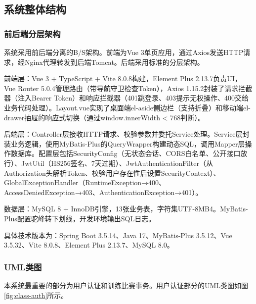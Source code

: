 \documentclass[12pt,a4paper]{ctexart}
\begin{document}
\subsection{系统整体结构}

\subsubsection{前后端分层架构}

系统采用前后端分离的B/S架构。前端为Vue 3单页应用，通过Axios发送HTTP请求，经Nginx代理转发到后端Tomcat。后端采用标准的分层架构。

前端层：Vue 3 + TypeScript + Vite 8.0.8构建，Element Plus 2.13.7负责UI，Vue Router 5.0.4管理路由（带导航守卫检查Token），Axios 1.15.2封装了请求拦截器（注入Bearer Token）和响应拦截器（401跳登录、403提示无权操作、400交给业务代码处理）。Layout.vue实现了桌面端el-aside侧边栏（支持折叠）和移动端el-drawer抽屉的响应式切换（通过window.innerWidth < 768判断）。

后端层：Controller层接收HTTP请求、校验参数并委托Service处理。Service层封装业务逻辑，使用MyBatis-Plus的QueryWrapper构建动态SQL，调用Mapper层操作数据库。配置层包括SecurityConfig（无状态会话、CORS白名单、公开接口放行）、JwtUtil（HS256签名、7天过期）、JwtAuthenticationFilter（从Authorization头解析Token、校验用户存在性后设置SecurityContext）、GlobalExceptionHandler（RuntimeException→400、AccessDeniedException→403、AuthenticationException→401）。

数据层：MySQL 8 + InnoDB引擎，13张业务表，字符集UTF-8MB4。MyBatis-Plus配置驼峰转下划线，开发环境输出SQL日志。

具体技术版本为：Spring Boot 3.5.14、Java 17、MyBatis-Plus 3.5.12、Vue 3.5.32、Vite 8.0.8、Element Plus 2.13.7、MySQL 8.0。

\subsubsection{UML类图}

本系统最重要的部分为用户认证和训练比赛事务。用户认证部分的UML类图如图\ref{fig:class-auth}所示。
\end{document}

